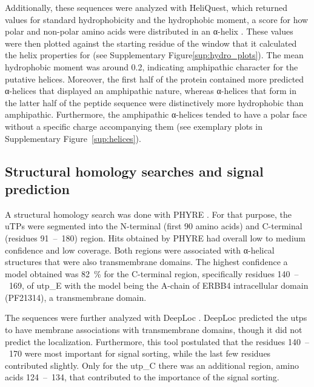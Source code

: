 Additionally, these sequences were analyzed with HeliQuest, which returned values for standard hydrophobicity and the hydrophobic moment, a score for how polar and non-polar amino acids were distributed in an α-helix \parencite{gautier_heliquest_2008}. These values were then plotted against the starting residue of the window that it calculated the helix properties for (see Supplementary Figure\ref{sup:hydro_plots}). The mean hydrophobic moment was around 0.2, indicating amphipathic character for the putative helices. Moreover, the first half of the protein contained more predicted α-helices that displayed an amphipathic nature, whereas α-helices that form in the latter half of the peptide sequence were distinctively more hydrophobic than amphipathic. Furthermore, the amphipathic α-helices tended to have a polar face without a specific charge accompanying them (see exemplary plots in Supplementary Figure~\ref{sup:helices}).


\subsection{Structural homology searches and signal prediction}
A structural homology search was done with PHYRE \parencite{powell_phyre22_2025}. For that purpose, the uTPs were segmented into the N-terminal (first 90 amino acids) and C-terminal (residues 91~--~180) region. Hits obtained by PHYRE had overall low to medium confidence and low coverage. Both regions were associated with α-helical structures that were also transmembrane domains. The highest confidence a model obtained was 82~\% for the C-terminal region, specifically residues 140~--~169, of \gls{utp_E} with the model being the A-chain of ERBB4 intracellular domain (PF21314), a transmembrane domain. 

\par The sequences were further analyzed with DeepLoc \parencite{odum_deeploc_2024}. DeepLoc predicted the \gls{utp}s to have membrane associations with transmembrane domains, though it did not predict the localization. Furthermore,  this tool postulated that the residues 140~--~170 were most important for signal sorting, while the last few residues contributed slightly. Only for the \gls{utp_C} there was an additional region, amino acids 124~--~134, that contributed to the importance of the signal sorting.
